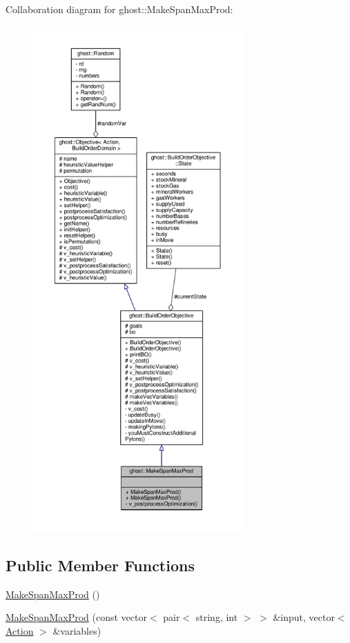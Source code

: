 Collaboration diagram for ghost\-:\-:Make\-Span\-Max\-Prod\-:
\nopagebreak
\begin{figure}[H]
\begin{center}
\leavevmode
\includegraphics[height=550pt]{classghost_1_1MakeSpanMaxProd__coll__graph}
\end{center}
\end{figure}
\subsection*{Public Member Functions}
\begin{DoxyCompactItemize}
\item 
\hyperlink{classghost_1_1MakeSpanMaxProd_a704e8a4cf63b8380cf05977441d4ba6c}{Make\-Span\-Max\-Prod} ()
\item 
\hyperlink{classghost_1_1MakeSpanMaxProd_ac0b0ad3d8d7b5aab182a96aac115b125}{Make\-Span\-Max\-Prod} (const vector$<$ pair$<$ string, int $>$ $>$ \&input, vector$<$ \hyperlink{classghost_1_1Action}{Action} $>$ \&variables)
\end{DoxyCompactItemize}
